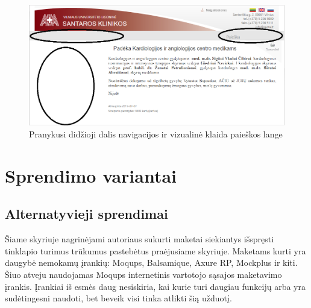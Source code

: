 \documentclass{VUMIFPSkursinis}
\begin{document}
\begin{figure}[H]
    \centering
    \includegraphics[scale=0.55]{img/AtvaizdavimoKlaida}
    \caption{Pranykusi didžioji dalis navigacijos ir vizualinė klaida paieškos lange}
    \label{img:atvaizdavimoklaida}
\end{figure}



\section{Sprendimo variantai}

\subsection{Alternatyvieji sprendimai}
Šiame skyriuje nagrinėjami autoriaus sukurti maketai siekiantys išspręsti tinklapio turimus trūkumus pastebėtus praėjusiame skyriuje. Maketams kurti yra daugybė nemokamų įrankių: Moqups, Balsamique, Axure RP, Mockplus ir kiti. Šiuo atveju naudojamas Moqups internetinis vartotojo sąsajos maketavimo įrankis. Įrankiai iš esmės daug nesiskiria, kai kurie turi daugiau funkcijų arba yra sudėtingesni naudoti, bet beveik visi tinka atlikti šią užduotį.
\end{document}
